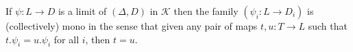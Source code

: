 If $\psi: L \longrightarrow D$ is a limit of $(\Delta, D)$ in $\mathcal{K}$ then the family $(\psi_i: L \longrightarrow D_i)$ is (collectively) mono in the sense that given any pair of maps $t, u: T \longrightarrow L$ such that $t.\psi_i = u.\psi_i$ for all $i$, then $t = u$.
